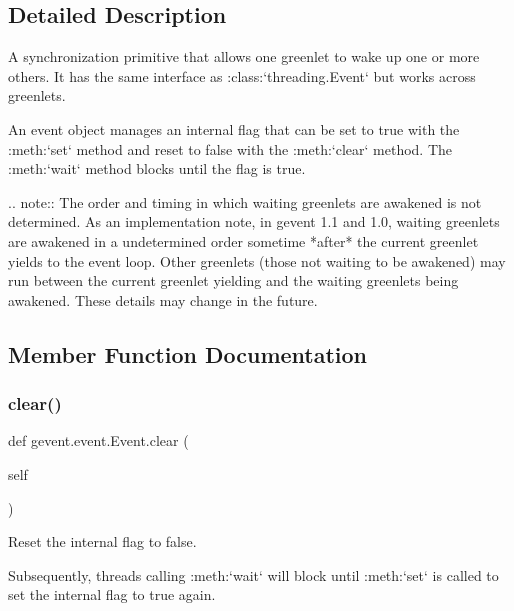 \subsection{Detailed Description}
\begin{DoxyVerb}A synchronization primitive that allows one greenlet to wake up one or more others.
It has the same interface as :class:`threading.Event` but works across greenlets.

An event object manages an internal flag that can be set to true with the
:meth:`set` method and reset to false with the :meth:`clear` method. The :meth:`wait` method
blocks until the flag is true.

.. note::
    The order and timing in which waiting greenlets are awakened is not determined.
    As an implementation note, in gevent 1.1 and 1.0, waiting greenlets are awakened in a
    undetermined order sometime *after* the current greenlet yields to the event loop. Other greenlets
    (those not waiting to be awakened) may run between the current greenlet yielding and
    the waiting greenlets being awakened. These details may change in the future.
\end{DoxyVerb}
 

\subsection{Member Function Documentation}
\mbox{\label{classgevent_1_1event_1_1_event_a45c1c24e6a87f2595c7e6c3276a55ec4}} 
\subsubsection{\texorpdfstring{clear()}{clear()}}
{\footnotesize\ttfamily def gevent.\+event.\+Event.\+clear (\begin{DoxyParamCaption}\item[{}]{self }\end{DoxyParamCaption})}

\begin{DoxyVerb}Reset the internal flag to false.

Subsequently, threads calling :meth:`wait` will block until
:meth:`set` is called to set the internal flag to true again.
\end{DoxyVerb}
 \mbox{\label{classgevent_1_1event_1_1_event_a5e28557387cbec46930dba5b29469360}} 

